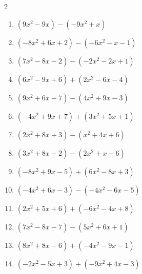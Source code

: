 \begin{multicols}{2}
\begin{enumerate}
  \item $(9x^{2}-9x)-(-9x^{2}+x)$


  \item $(-8x^{2}+6x+2)-(-6x^{2}-x-1)$


  \item $(7x^{2}-8x-2)-(-2x^{2}-2x+1)$


  \item $(6x^{2}-9x+6)+(2x^{2}-6x-4)$


  \item $(9x^{2}+6x-7)-(4x^{2}+9x-3)$


  \item $(-4x^{2}+9x+7)+(3x^{2}+5x+1)$


  \item $(2x^{2}+8x+3)-(x^{2}+4x+6)$


  \item $(3x^{2}+8x-2)-(2x^{2}+x-6)$


  \item $(-8x^{2}+9x-5)+(6x^{2}-8x+3)$


  \item $(-4x^{2}+6x-3)-(-4x^{2}-6x-5)$

        \phantom{$=12x+2$}

  \item $(2x^{2}+5x+6)+(-6x^{2}-4x+8)$


  \item $(7x^{2}-8x-7)-(5x^{2}+6x+1)$


  \item $(8x^{2}+8x-6)+(-4x^{2}-9x-1)$


  \item $(-2x^{2}-5x+3)+(-9x^{2}+4x-3)$


\end{enumerate}
\end{multicols}
